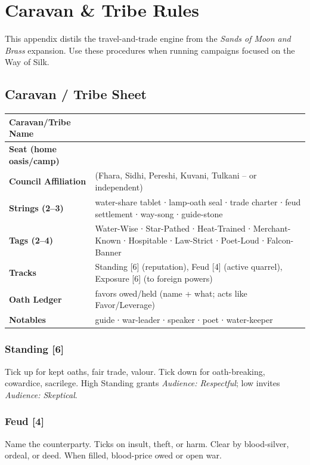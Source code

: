 \documentclass[12pt,oneside]{book}
\begin{document}
\appendix
\chapter{Caravan \& Tribe Rules}

This appendix distils the travel-and-trade engine from the \textit{Sands of Moon and Brass} expansion. Use these procedures when running campaigns focused on the Way of Silk.

\section*{Caravan / Tribe Sheet}
\begin{longtable}{|p{}|p{}|}
\hline
\textbf{Caravan/Tribe Name} & \\
\hline
\textbf{Seat (home oasis/camp)} & \\
\hline
\textbf{Council Affiliation} & (Fhara, Sidhi, Pereshi, Kuvani, Tulkani -- or independent) \\
\hline
\textbf{Strings (2--3)} & water-share tablet ∙ lamp-oath seal ∙ trade charter ∙ feud settlement ∙ way-song ∙ guide-stone \\
\hline
\textbf{Tags (2--4)} & Water-Wise ∙ Star-Pathed ∙ Heat-Trained ∙ Merchant-Known ∙ Hospitable ∙ Law-Strict ∙ Poet-Loud ∙ Falcon-Banner \\
\hline
\textbf{Tracks} & Standing [6] (reputation), Feud [4] (active quarrel), Exposure [6] (to foreign powers) \\
\hline
\textbf{Oath Ledger} & favors owed/held (name + what; acts like Favor/Leverage) \\
\hline
\textbf{Notables} & guide ∙ war-leader ∙ speaker ∙ poet ∙ water-keeper \\
\hline
\end{longtable}

\subsection*{Standing [6]}
Tick up for kept oaths, fair trade, valour. Tick down for oath-breaking, cowardice, sacrilege. High Standing grants \textit{Audience: Respectful}; low invites \textit{Audience: Skeptical}.

\subsection*{Feud [4]}
Name the counterparty. Ticks on insult, theft, or harm. Clear by blood-silver, ordeal, or deed. When filled, blood-price owed or open war.
\end{document}
